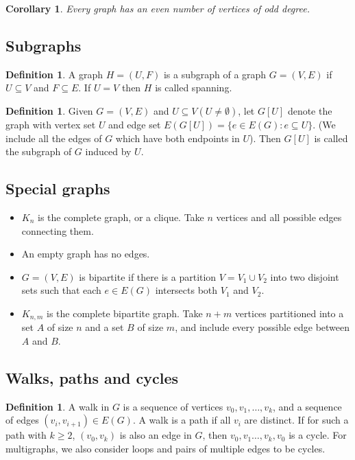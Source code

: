 \documentclass[10pt, fleqn, a4paper, landscape]{article}
\theoremstyle{plain} %
\newtheorem{cor}[thm]{Corollary}
\theoremstyle{remark} %
\theoremstyle{definition} %
\newtheorem{defi}[thm]{Definition}
\begin{document}
\begin{multicols}{3}
\begin{tiny}
\begin{cor}
Every graph has an even number of vertices of odd degree.
\end{cor}

\subsection{Subgraphs}

\begin{defi}
A graph $H = (U, F)$ is a subgraph of a graph $G = (V,E)$ if $U \subseteq V$ and $F \subseteq E$. If $U = V$ then $H$ is called spanning.
\end{defi}

\begin{defi}
Given $G = (V,E)$ and $U\subseteq  V (U \ne \emptyset)$, let $G[U]$ denote the graph with vertex set $U$ and edge set $E(G[U]) = \{e \in E(G) : e \subseteq U\}$. (We include all the edges of $G$ which have both
endpoints in $U$). Then $G[U]$ is called the subgraph of $G$ induced by $U$.
\end{defi}
\addtocounter{thm}{1}
\subsection{Special graphs}

\begin{itemize}
\item  $K_n$ is the complete graph, or a clique. Take $n$ vertices and all possible edges connecting them.
\item An empty graph has no edges.
\item $G = (V,E)$ is bipartite if there is a partition $V = V_1 \cup V_2$ into two disjoint sets such that each $e \in E(G)$ intersects both $V_1$ and $V_2$.
\item $K_{n,m}$ is the complete bipartite graph. Take $n + m$ vertices partitioned into a set $ A$ of size $n$ and a set $B$ of size $m$, and include every possible edge between $A$ and $B$.
\end{itemize}
\addtocounter{thm}{1}
\subsection{Walks, paths and cycles}

\begin{defi}
A walk in $G$ is a sequence of vertices $v_0, v_1, \dots , v_k$, and a sequence of edges $(v_i, v_{i+1}) \in E(G)$. A walk is a path if all $v_i$ are distinct. If for such a path with $k \ge 2$, $(v_0, v_k)$ is also
an edge in $G$, then $v_0, v_1 \dots , v_k, v_0$ is a cycle. For multigraphs, we also consider loops and pairs of multiple edges to be cycles.
\end{defi}


\end{tiny}
\end{multicols}
\end{document}

